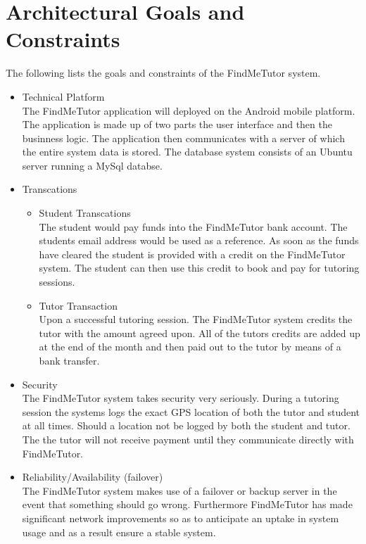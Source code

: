 \documentclass[12pt]{article}
\begin{document}
\section{Architectural Goals and Constraints}
The following lists the goals and constraints of the FindMeTutor system.
\begin{itemize}
\item Technical Platform\\
The FindMeTutor application will deployed on the Android mobile platform. The application is made up of two parts the user interface and then the businness logic. The application then communicates with a server of which the entire system data is stored. The database system consists of an Ubuntu server running a MySql databse.
\item Transcations
\begin{itemize}
\item Student Transcations\\
The student would pay funds into the FindMeTutor bank account. The students email address would be used as a reference. As soon as the funds have cleared the student is provided with a credit on the FindMeTutor system. The student can then use this credit to book and pay for tutoring sessions.
\item Tutor Transaction\\
Upon a successful tutoring session. The FindMeTutor system credits the tutor with the amount agreed upon. All of the tutors credits are added up at the end of the month and then paid out to the tutor by means of a bank transfer.
\end{itemize}
\item Security\\
The FindMeTutor system takes security very seriously. During a tutoring session the systems logs the exact GPS location of both the tutor and student at all times. Should a location not be logged by both the student and tutor. The the tutor will not receive payment until they communicate directly with FindMeTutor.
\item Reliability/Availability (failover)\\
The FindMeTutor system makes use of a failover or backup server in the event that something should go wrong. Furthermore FindMeTutor has made significant network improvements so as to anticipate an uptake in system usage and as a result ensure a stable system.
\end{itemize}
\end{document}
